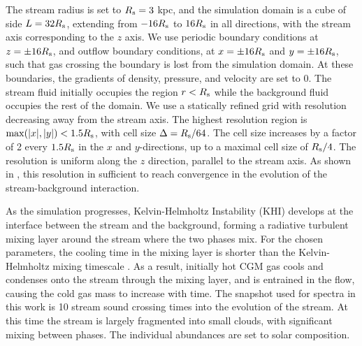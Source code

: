 \documentclass[fleqn,usenatbib]{mnras}
\begin{document}
The stream radius is set to $R_{\rm s}=3$ kpc, and the simulation domain is a cube of side $L=32R_{\rm s}$, extending from $-16R_{\rm s}$ to $16R_{\rm s}$ in all directions, with the stream axis corresponding to the $z$ axis.
We use periodic boundary conditions at $z=\pm 16R_{\rm s}$, and outflow boundary conditions, at $x=\pm 16R_{\rm s}$ and $y=\pm 16R_{\rm s}$, such that gas crossing the boundary is lost from the simulation domain.
At these boundaries, the gradients of density, pressure, and velocity are set to 0.
The stream fluid initially occupies the region $r<R_{\rm s}$ while the background fluid occupies the rest of the domain.
We use a statically refined grid with resolution decreasing away from the stream axis. The highest resolution region is ${\rm max}(|x|,|y|)<1.5R_{\rm s}$, with cell size $\Delta=R_{\rm s}/64$.
The cell size increases by a factor of 2 every $1.5R_{\rm s}$ in the $x$ and $y$-directions, up to a maximal cell size of $R_{\rm s}/4$.
The resolution is uniform along the $z$ direction, parallel to the stream axis.
As shown in \cite{Mandelker2020a}, this resolution in sufficient to reach convergence in the evolution of the stream-background interaction.

As the simulation progresses, Kelvin-Helmholtz Instability (KHI) develops at the interface between the stream and the background, forming a radiative turbulent mixing layer around the stream where the two phases mix.
For the chosen parameters, the cooling time in the mixing layer is shorter than the Kelvin-Helmholtz mixing timescale \citep{Mandelker2020a}.
As a result, initially hot CGM gas cools and condenses onto the stream through the mixing layer, and is entrained in the flow, causing the cold gas mass to increase with time.
The snapshot used for spectra in this work is 10 stream sound crossing times into the evolution of the stream.
At this time the stream is largely fragmented into small clouds, with significant mixing between phases.
The individual abundances are set to solar composition.
\end{document}

